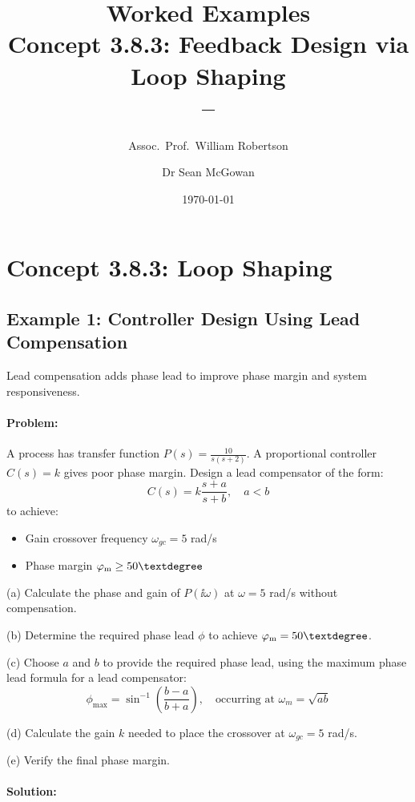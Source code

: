 \documentclass[11pt,a4paper]{article}
\title{\textbf{Worked Examples}\\[0.5em]
\large Concept 3.8.3: Feedback Design via Loop Shaping\\[0.3em]
\normalsize \coursesubtitle{} -- \coursetitle}
\author{Assoc.\ Prof.\ William Robertson \and Dr Sean McGowan}
\date{\today}
\begin{document}
\maketitle
\tableofcontents
\newpage

\section{Concept 3.8.3: Loop Shaping}

\subsection{Example 1: Controller Design Using Lead Compensation}

Lead compensation adds phase lead to improve phase margin and system responsiveness.

\paragraph{Problem:}
A process has transfer function $P(s) = \frac{10}{s(s+2)}$. A proportional controller $C(s) = k$ gives poor phase margin. Design a lead compensator of the form:
\begin{equation}
  C(s) = k\frac{s + a}{s + b}, \quad a < b
\end{equation}
to achieve:
\begin{itemize}
  \item Gain crossover frequency $\omega_{gc} = 5$ rad/s
  \item Phase margin $\phasemargin \geq 50°$
\end{itemize}

(a) Calculate the phase and gain of $P(\ii\omega)$ at $\omega = 5$ rad/s without compensation.

(b) Determine the required phase lead $\phi$ to achieve $\phasemargin = 50°$.

(c) Choose $a$ and $b$ to provide the required phase lead, using the maximum phase lead formula for a lead compensator:
\begin{equation}
  \phi_{\max} = \sin^{-1}\left(\frac{b-a}{b+a}\right), \quad \text{occurring at } \omega_m = \sqrt{ab}
\end{equation}

(d) Calculate the gain $k$ needed to place the crossover at $\omega_{gc} = 5$ rad/s.

(e) Verify the final phase margin.

\paragraph{Solution:}
\end{document}

